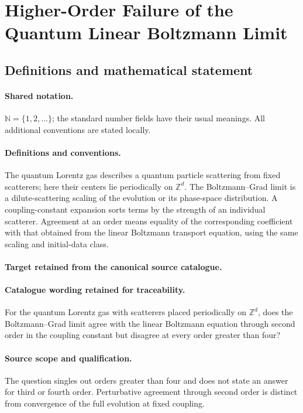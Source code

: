 \documentclass[11pt]{article}
\begin{document}
\section{Higher-Order Failure of the Quantum Linear Boltzmann Limit}\label{statement}

\subsection{Definitions and mathematical statement}

\paragraph{Shared notation.}$\mathbb N=\{1,2,\ldots\}$; the standard number fields have their usual meanings. All additional conventions are stated locally.


\paragraph{Definitions and conventions.}
The quantum Lorentz gas describes a quantum particle scattering from fixed scatterers; here their centers lie periodically on $\mathbb Z^d$. The Boltzmann--Grad limit is a dilute-scattering scaling of the evolution or its phase-space distribution. A coupling-constant expansion sorts terms by the strength of an individual scatterer. Agreement at an order means equality of the corresponding coefficient with that obtained from the linear Boltzmann transport equation, using the same scaling and initial-data class.

\paragraph{Target retained from the canonical source catalogue.}
\paragraph{Catalogue wording retained for traceability.}
For the quantum Lorentz gas with scatterers placed periodically on $\mathbb Z^d$, does the Boltzmann–Grad limit agree with the linear Boltzmann equation through second order in the coupling constant but disagree at every order greater than four?

\paragraph{Source scope and qualification.}
The question singles out orders greater than four and does not state an answer for third or fourth order. Perturbative agreement through second order is distinct from convergence of the full evolution at fixed coupling.
\end{document}
